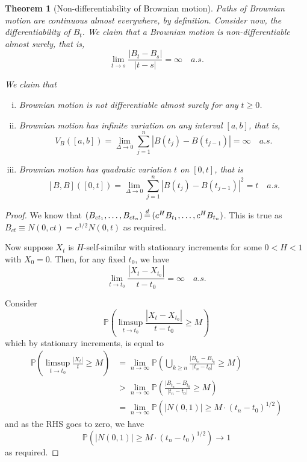 \documentclass[10pt, oneside, reqno]{amsart}
\theoremstyle{plain}%
\newtheorem{thm}{Theorem}[section]
\theoremstyle{definition}
\theoremstyle{remark}
\renewcommand{\P}{\mathbb{P}}
\def\eqd{\,{\buildrel d \over =}\,}
\begin{document}
\begin{thm}[Non-differentiability of Brownian motion]
	Paths of Brownian motion are continuous almost everywhere, by definition.  Consider now, the differentiability of $B_t$.  We claim that a Brownian motion is non-differentiable almost surely, that is, \[
		\lim_{t \rightarrow s} \frac{|B_t - B_s|}{|t - s|} = \infty \quad a.s.
	\]
	
	We claim that
	\begin{enumerate}[(i)]
		\item Brownian motion is not differentiable almost surely for any $t \geq 0$.
		\item Brownian motion has infinite variation on any interval $[a,b]$, that is,\[
			V_B([a,b]) = \lim_{\Delta \rightarrow 0} \sum_{j=1}^n |B(t_j) - B(t_{j-1})| = \infty \quad a.s.
		\]
		\item Brownian motion has quadratic variation $t$ on $[0,t]$, that is \[
			[B,B]([0,t]) = \lim_{\Delta \rightarrow 0} \sum_{j=1}^n |B(t_j) - B(t_{j-1})|^2 = t \quad a.s.
		\] 
	\end{enumerate}
\end{thm} 

\begin{proof}
	We know that $(B_{ct_1},\dots, B_{ct_n} ) \eqd (c^H B_{t_1}, \dots, c^H B_{t_n})$.  This is true as $B_{ct} \equiv N(0, ct) = c^{1/2} N(0,t)$ as required.  
	
	Now suppose $X_t$ is $H$-self-similar with stationary increments for some $0 < H < 1$ with $X_0 = 0$.  Then, for any fixed $t_0$, we have \[
		\lim_{t \rightarrow t_0} \frac{|X_t - X_{t_0}|}{t - t_0} = \infty \quad a.s.
	\]
	
	Consider
	\[
		\P( \limsup_{t \rightarrow t_0} \frac{ |X_t - X_{t_0} |}{t - t_0} \geq M) 
	\] which by stationary increments, is equal to 
	\begin{align*}
		\P( \limsup_{t \rightarrow t_0} \frac{ |X_t |}{t} \geq M) &= \lim_{n \rightarrow \infty}\P( \bigcup_{k \geq n} \frac{|B_{t_n} - B_{t_0}}{|t_n - t_0|} \geq M) \\
		&> \lim_{n\rightarrow \infty} \P( \frac{|B_{t_n} - B_{t_0}}{|t_n - t_0|} \geq M ) \\
		&= \lim_{n \rightarrow \infty} \P( |N(0,1) | \geq M \cdot (t_n - t_0)^{1/2})
	\end{align*}
	and as the RHS goes to zero, we have \[
	\P( |N(0,1) | \geq M \cdot (t_n - t_0)^{1/2}) \rightarrow 1
	\]
	as required.
\end{proof}
\end{document}
